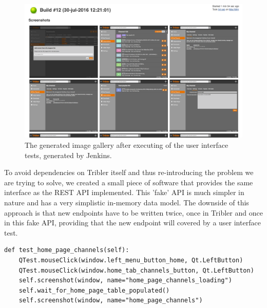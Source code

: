 \begin{figure}[h!]
	\centering
	\includegraphics[width=1.0\columnwidth]{images/improving_qa/gallery_jenkins}
	\caption{The generated image gallery after executing of the user interface tests, generated by Jenkins.}
	\label{fig:jenkins-gallery}
\end{figure}

To avoid dependencies on Tribler itself and thus re-introducing the problem we are trying to solve, we created a small piece of software that provides the same interface as the REST API implemented. This 'fake' API is much simpler in nature and has a very simplistic in-memory data model. The downside of this approach is that new endpoints have to be written twice, once in Tribler and once in this fake API, providing that the new endpoint will covered by a user interface test.

\begin{lstlisting}[caption={A sample of a test that tests the new Qt Tribler GUI.},label={lst:qtest-sample}]
def test_home_page_channels(self):
	QTest.mouseClick(window.left_menu_button_home, Qt.LeftButton)
	QTest.mouseClick(window.home_tab_channels_button, Qt.LeftButton)
	self.screenshot(window, name="home_page_channels_loading")
	self.wait_for_home_page_table_populated()
	self.screenshot(window, name="home_page_channels")
\end{lstlisting}

